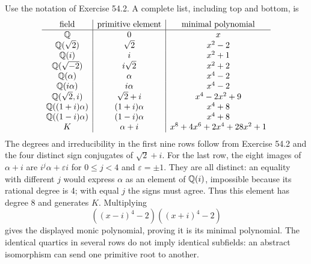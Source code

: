 Use the notation of Exercise 54.2. A complete list, including top and bottom, is
\[
\begin{array}{c|c|c}
\text{field}&\text{primitive element}&\text{minimal polynomial}\\\hline
\mathbb{Q}&0&x\\
\mathbb{Q}(\sqrt2)&\sqrt2&x^2-2\\
\mathbb{Q}(i)&i&x^2+1\\
\mathbb{Q}(\sqrt{-2})&i\sqrt2&x^2+2\\
\mathbb{Q}(\alpha)&\alpha&x^4-2\\
\mathbb{Q}(i\alpha)&i\alpha&x^4-2\\
\mathbb{Q}(\sqrt2,i)&\sqrt2+i&x^4-2x^2+9\\
\mathbb{Q}((1+i)\alpha)&(1+i)\alpha&x^4+8\\
\mathbb{Q}((1-i)\alpha)&(1-i)\alpha&x^4+8\\
K&\alpha+i&x^8+4x^6+2x^4+28x^2+1
\end{array}
\]
The degrees and irreducibility in the first nine rows follow from Exercise 54.2 and the four distinct sign conjugates of $\sqrt2+i$. For the last row, the eight images of $\alpha+i$ are $i^j\alpha+\varepsilon i$ for $0\le j<4$ and $\varepsilon=\pm1$. They are all distinct: an equality with different $j$ would express $\alpha$ as an element of $\mathbb{Q}(i)$, impossible because its rational degree is 4; with equal $j$ the signs must agree. Thus this element has degree 8 and generates $K$. Multiplying
\[((x-i)^4-2)((x+i)^4-2)\]
gives the displayed monic polynomial, proving it is its minimal polynomial. The identical quartics in several rows do not imply identical subfields: an abstract isomorphism can send one primitive root to another.


